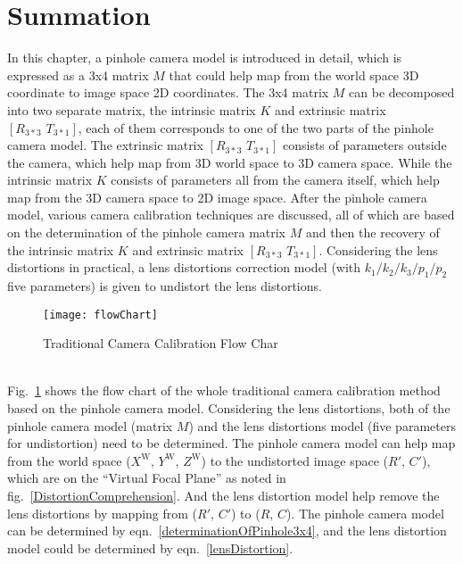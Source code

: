 \section{Summation}
%
\indent
\indent In this chapter, a pinhole camera model is introduced in detail, which is expressed as a 3x4 matrix \(M\) that could help map from the world space 3D coordinate to image space 2D coordinates. The 3x4 matrix \(M\) can be decomposed into two separate matrix, the intrinsic matrix \(K\) and extrinsic matrix \([R_{3*3}\,\,T_{3*1}]\), each of them corresponds to one of the two parts of the pinhole camera model. The extrinsic matrix \([R_{3*3}\,\,T_{3*1}]\) consists of parameters outside the camera, which help map from 3D world space to 3D camera space. While the intrinsic matrix \(K\) consists of parameters all from the camera itself, which help map from the 3D camera space to 2D image space. After the pinhole camera model, various camera calibration techniques are discussed, all of which are based on the determination of the pinhole camera matrix \(M\) and then the recovery of the intrinsic matrix \(K\) and extrinsic matrix \([R_{3*3}\,\,T_{3*1}]\). Considering the lens distortions in practical, a lens distortions correction model (with  \(k_1/k_2/k_3/p_1/p_2\) five parameters) is given to undistort the lens distortions. 
%
\begin{figure}[t]
\centering
\texttt{[image: flowChart]}
\caption{Traditional Camera Calibration Flow Char}
\label{flowChart}
\end{figure}%
\\\indent
Fig.~\ref{flowChart} shows the flow chart of the whole traditional camera calibration method based on the pinhole camera model. Considering the lens distortions, both of the pinhole camera model (matrix \(M\)) and the lens distortions model (five parameters for undistortion) need to be determined. The pinhole camera model can help map from the world space (\(X^\text{W}, \, Y^\text{W}, \, Z^\text{W}\)) to the undistorted image space (\(R', \, C'\)), which are on the \enquote{Virtual Focal Plane} as noted in fig.~\ref{DistortionComprehension}. And the lens distortion model help remove the lens distortions by mapping from (\(R', \, C'\)) to (\(R, \, C\)). The pinhole camera model can be determined by eqn.~\ref{determinationOfPinhole3x4}, and the lens distortion model could be determined by eqn.~\ref{lensDistortion}.



























